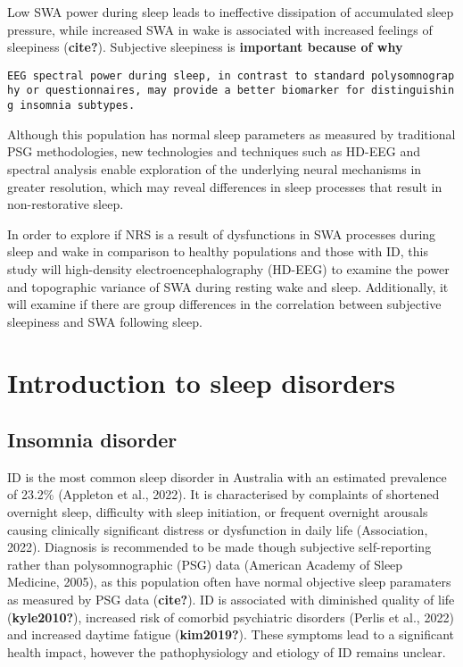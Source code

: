 \documentclass[
]{article}
\begin{document}
Low SWA power during sleep leads to ineffective dissipation of
accumulated sleep pressure, while increased SWA in wake is associated
with increased feelings of sleepiness (\textbf{cite?}). Subjective
sleepiness is \textbf{important because of why}

\texttt{EEG\ spectral\ power\ during\ sleep,\ in\ contrast\ to\ standard\ polysomnography\ or\ questionnaires,\ may\ provide\ a\ better\ biomarker\ for\ distinguishing\ insomnia\ subtypes.}

Although this population has normal sleep parameters as measured by
traditional PSG methodologies, new technologies and techniques such as
HD-EEG and spectral analysis enable exploration of the underlying neural
mechanisms in greater resolution, which may reveal differences in sleep
processes that result in non-restorative sleep.

In order to explore if NRS is a result of dysfunctions in SWA processes
during sleep and wake in comparison to healthy populations and those
with ID, this study will high-density electroencephalography (HD-EEG) to
examine the power and topographic variance of SWA during resting wake
and sleep. Additionally, it will examine if there are group differences
in the correlation between subjective sleepiness and SWA following
sleep.

\section{Introduction to sleep
disorders}\label{introduction-to-sleep-disorders}

\subsection{Insomnia disorder}\label{insomnia-disorder}

ID is the most common sleep disorder in Australia with an estimated
prevalence of 23.2\% (Appleton et al., 2022). It is characterised by
complaints of shortened overnight sleep, difficulty with sleep
initiation, or frequent overnight arousals causing clinically
significant distress or dysfunction in daily life (Association, 2022).
Diagnosis is recommended to be made though subjective self-reporting
rather than polysomnographic (PSG) data (American Academy of Sleep
Medicine, 2005), as this population often have normal objective sleep
paramaters as measured by PSG data (\textbf{cite?}). ID is associated
with diminished quality of life (\textbf{kyle2010?}), increased risk of
comorbid psychiatric disorders (Perlis et al., 2022) and increased
daytime fatigue (\textbf{kim2019?}). These symptoms lead to a
significant health impact, however the pathophysiology and etiology of
ID remains unclear.
\end{document}
